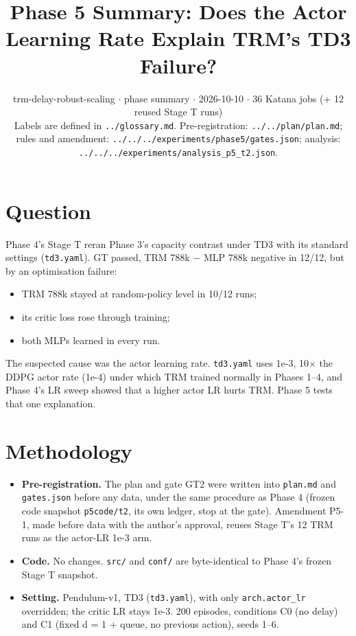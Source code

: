 \documentclass[11pt]{article}
\title{Phase 5 Summary: Does the Actor Learning Rate Explain TRM's TD3 Failure?}
\author{}
\date{trm-delay-robust-scaling $\cdot$ phase summary $\cdot$ 2026-10-10 $\cdot$ 36 Katana jobs (+ 12 reused Stage T runs)\\[2pt]Labels are defined in \texttt{.\allowbreak{}.\allowbreak{}/\allowbreak{}glossary.\allowbreak{}md}. Pre-registration: \texttt{.\allowbreak{}.\allowbreak{}/\allowbreak{}.\allowbreak{}.\allowbreak{}/\allowbreak{}plan/\allowbreak{}plan.\allowbreak{}md}; rules and amendment: \texttt{.\allowbreak{}.\allowbreak{}/\allowbreak{}.\allowbreak{}.\allowbreak{}/\allowbreak{}.\allowbreak{}.\allowbreak{}/\allowbreak{}experiments/\allowbreak{}phase5/\allowbreak{}gates.\allowbreak{}json}; analysis: \texttt{.\allowbreak{}.\allowbreak{}/\allowbreak{}.\allowbreak{}.\allowbreak{}/\allowbreak{}.\allowbreak{}.\allowbreak{}/\allowbreak{}experiments/\allowbreak{}analysis\_\allowbreak{}p5\_\allowbreak{}t2.\allowbreak{}json}.}
\begin{document}
\maketitle
\section*{Question}



Phase 4's Stage T reran Phase 3's capacity contrast under TD3 with its standard settings (\texttt{td3.yaml}). GT passed, TRM 788k $-$ MLP 788k negative in 12/12, but by an optimisation failure:

\begin{itemize}
\item TRM 788k stayed at random-policy level in 10/12 runs;
\item its critic loss rose through training;
\item both MLPs learned in every run.
\end{itemize}



The suspected cause was the actor learning rate. \texttt{td3.yaml} uses 1e-3, 10$\times$ the DDPG actor rate (1e-4) under which TRM trained normally in Phases 1--4, and Phase 4's LR sweep showed that a higher actor LR hurts TRM. Phase 5 tests that one explanation.



\section*{Methodology}



\begin{itemize}
\item \textbf{Pre-registration.} The plan and gate GT2 were written into \texttt{plan.md} and \texttt{gates.json} before any data, under the same procedure as Phase 4 (frozen code snapshot \texttt{p5code/t2}, its own ledger, stop at the gate). Amendment P5-1, made before data with the author's approval, reuses Stage T's 12 TRM runs as the actor-LR 1e-3 arm.
\item \textbf{Code.} No changes. \texttt{src/} and \texttt{conf/} are byte-identical to Phase 4's frozen Stage T snapshot.
\item \textbf{Setting.} Pendulum-v1, TD3 (\texttt{td3.yaml}), with only \texttt{arch.actor\_lr} overridden; the critic LR stays 1e-3. 200 episodes, conditions C0 (no delay) and C1 (fixed d = 1 + queue, no previous action), seeds 1--6.
\end{itemize}
\end{document}
